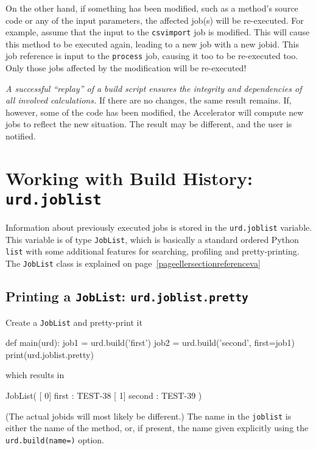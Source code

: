 On the other hand, if something has been modified, such as a method's
source code or any of the input parameters, the affected job(s) will
be re-executed.  For example, assume that the input to
the \texttt{csvimport} job is modified.  This will cause this method
to be executed again, leading to a new job with a new jobid.  This job
reference is input to the \texttt{process} job, causing it too to be
re-executed too.  Only those jobs affected by the modification will be
re-executed!

\textsl{A successful ``replay'' of a build script ensures the integrity and
dependencies of all involved calculations.}  If there are no changes,
the same result remains.  If, however, some of the code has been
modified, the Accelerator will compute new jobs to reflect the new
situation.  The result may be different, and the user is notified.


\section{Working with Build History:  \texttt{urd.joblist}}
\label{sec:joblist}

Information about previously executed jobs is stored in
the \texttt{urd.joblist} variable.  This variable is of
type \texttt{JobList}, which is basically a standard ordered
Python \texttt{list} with some additional features for searching,
profiling and pretty-printing.  The \texttt{JobList} class is explained on page~\ref{pageellersectionreferenceva}



\subsection{Printing a \texttt{JobList}:  \texttt{urd.joblist.pretty}}
Create a \texttt{JobList} and pretty-print it
\begin{python}
def main(urd):
    job1 = urd.build('first')
    job2 = urd.build('second', first=job1)
    print(urd.joblist.pretty)
\end{python}
which results in
\begin{shell}
JobList(
   [  0]  first : TEST-38
   [  1] second : TEST-39
)
\end{shell}
(The actual jobids will most likely be different.)  The name in
the \texttt{joblist} is either the name of the method, or, if present,
the name given explicitly using the \texttt{urd.build(name=)} option.



